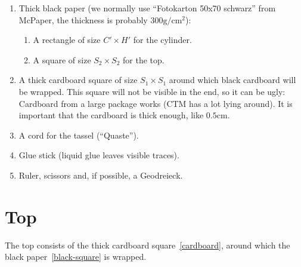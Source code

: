\documentclass[a4paper,10pt]{article}
\begin{document}
	\begin{enumerate}[(1)]
		\item Thick black paper (we normally use \enquote{Fotokarton 50x70 schwarz} from McPaper, the thickness is probably 300$ \text{g}/\text{cm}^2 $):
		\begin{enumerate}[label=(1.\alph*)]
			\item\label{black-cyl} A rectangle of size $ C' \times H' $ for the cylinder.
			\item\label{black-square} A square of size $ S_2 \times S_2 $ for the top.
		\end{enumerate}
		
		\item\label{cardboard} A thick cardboard square of size $ S_1 \times S_1 $ around which black cardboard will be wrapped. This square will not be visible in the end, so it can be ugly: Cardboard from a large package works (CTM has a lot lying around). It is important that the cardboard is thick enough, like $ 0.5\text{cm} $.
		
		\item A cord for the tassel (\enquote{Quaste}).
		
		\item Glue stick (liquid glue leaves visible traces).
		
		\item Ruler, scissors and, if possible, a Geodreieck.
	\end{enumerate}
	
	\newpage
	
	\section*{Top}
	
	The top consists of the thick cardboard square~\ref{cardboard}, around which the black paper~\ref{black-square} is wrapped.
	
\end{document}
